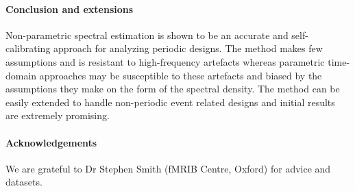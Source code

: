 \documentclass[a0,portrait]{a0poster}
\begin{document}
\begin{center}
{\paragraph{Conclusion and extensions}
Non-parametric spectral estimation is shown to be an accurate and self-calibrating approach for analyzing periodic designs. The method makes few assumptions and is resistant to high-frequency artefacts whereas parametric time-domain approaches may be susceptible to these artefacts and biased by the assumptions they make on the form of the spectral density. The method can be easily extended to handle non-periodic event related designs and initial results are extremely promising.
\paragraph{Acknowledgements} We are grateful to Dr Stephen Smith (fMRIB Centre, Oxford) for
advice and datasets.


}
\end{center}


\makefooter
\end{document}
